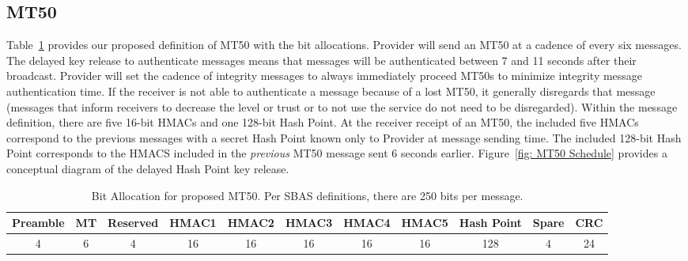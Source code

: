 \documentclass[APA,STIX1COL]{IONjournal/ION-APA Template}
\begin{document}
	\subsection{MT50} \label{sub:mt50}

		Table~\ref{tab: mt50} provides our proposed definition of MT50 with the bit allocations.
		Provider will send an MT50 at a cadence of every six messages.
		The delayed key release to authenticate messages means that messages will be authenticated between 7 and 11 seconds after their broadcast.
		Provider will set the cadence of integrity messages to always immediately proceed MT50s to minimize integrity message authentication time.
		If the receiver is not able to authenticate a message because of a lost MT50, it generally disregards that message (messages that inform receivers to decrease the level or trust or to not use the service do not need to be disregarded).
		Within the message definition, there are five 16-bit HMACs and one 128-bit Hash Point.
		At the receiver receipt of an MT50, the included five HMACs correspond to the previous messages with a secret Hash Point known only to Provider at message sending time.
		The included 128-bit Hash Point corresponds to the HMACS included in the {\em previous} MT50 message sent 6 seconds earlier.
		Figure~\ref{fig: MT50 Schedule} provides a conceptual diagram of the delayed Hash Point key release.

		\begin{table}%
			\center
			\begin{tabular}{|c|c|c|c|c|c|c|c|c|c|c|} \hline
				Preamble & MT & Reserved & HMAC1 & HMAC2 & HMAC3 & HMAC4 & HMAC5 & Hash Point & Spare & CRC \\ \hline
				4 & 6 & 4 & 16 & 16 & 16 & 16 & 16 & 128 & 4 & 24 \\ \hline
			\end{tabular}
			\caption{Bit Allocation for proposed MT50. Per SBAS definitions, there are 250 bits per message.}
			\label{tab: mt50}
		\end{table}
\end{document}
